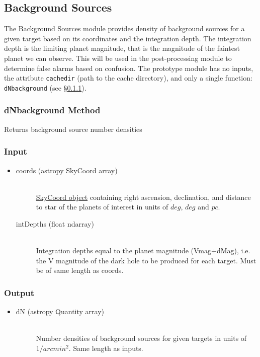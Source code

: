 \documentclass[cleanfoot]{asme2ej}
\begin{document}
\subsection{Background Sources}\label{sec:backgroundsources}

The Background Sources module provides density of background sources for a given target based on its coordinates and the integration depth. The integration depth is the limiting planet magnitude, that is the magnitude of the faintest planet we can observe. This will be used in the post-processing module to determine false alarms based on confusion.  The prototype module has no inputs, the attribute \texttt{cachedir} (path to the cache directory), and only a single function: \verb+dNbackground+ (see \S\ref{sec:dNbackgroundtask}).

\subsubsection{dNbackground Method} \label{sec:dNbackgroundtask}
Returns background source number densities
\subsubsection*{Input}
\begin{itemize}
\item 
\begin{description}
    \item[coords (astropy SkyCoord array)] \hfill \\ \href{http://astropy.readthedocs.org/en/latest/api/astropy.coordinates.SkyCoord.html}{SkyCoord object} containing right ascension, declination, and  distance to star of the planets of interest in units of $ deg $, $ deg $ and $ pc $.
    \item[intDepths (float ndarray)] \hfill \\ Integration depths equal to the planet magnitude (Vmag+dMag), i.e. the V magnitude of the dark hole to be produced for each target. Must be of same length as coords.
\end{description}
\end{itemize}

\subsubsection*{Output}
\begin{itemize}
\item 
\begin{description}
    \item[dN (astropy Quantity array)] \hfill \\ Number densities of background sources for given targets in  units of $ 1/arcmin^2 $. Same length as inputs.
\end{description}
\end{itemize}
\end{document}
